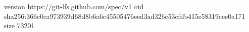 version https://git-lfs.github.com/spec/v1
oid sha256:366c0ca973939d68d8b6a6c45505476eed3ad326c53cfdb415e58319cee0a171
size 73201
